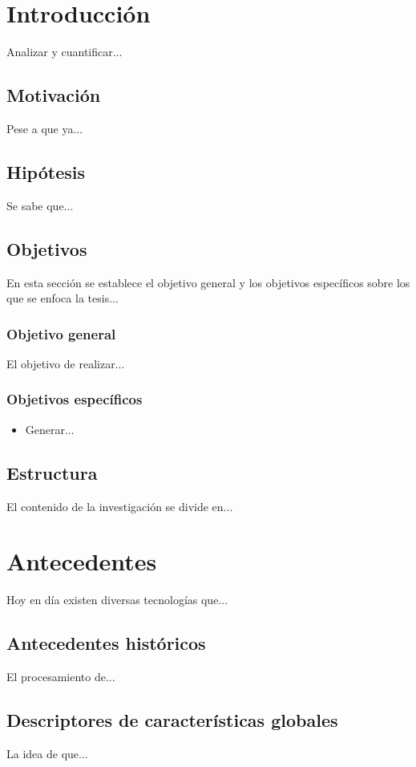 \chapter{Introducción}
Analizar y cuantificar...
\clearpage

\section{Motivación}
Pese a que ya...

\section{Hipótesis}
Se sabe que...

\section{Objetivos}
En esta sección se establece el objetivo general y los objetivos específicos sobre los que se enfoca la tesis...

\subsection{Objetivo general}
El objetivo de realizar...

\subsection{Objetivos específicos}
\begin{itemize}
\item Generar...
\end{itemize}

\section{Estructura}
El contenido de la investigación se divide en...


\chapter{Antecedentes}
Hoy en día existen diversas tecnologías que...

\section{Antecedentes históricos}
El procesamiento de...

\section{Descriptores de características globales}
La idea de que... 

